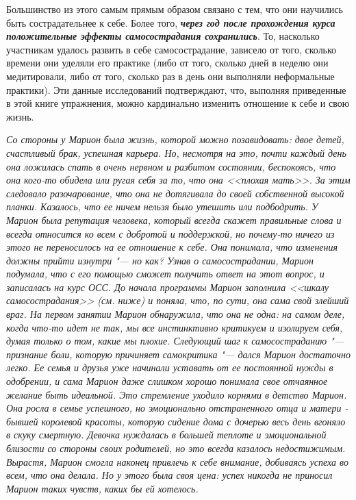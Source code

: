 Большинство из этого самым прямым образом связано с тем, что они научились быть сострадательнее к себе. Более того, \textit{\textbf{через год после прохождения курса положительные эффекты самосострадания сохранились}}. То, насколько участникам удалось развить в себе самосострадание, зависело от того, сколько времени они уделяли его практике (либо от того, сколько дней в неделю они медитировали, либо от того, сколько раз в день они выполняли неформальные практики). Эти данные исследований подтверждают, что, выполняя приведенные в этой книге упражнения, можно кардинально изменить отношение к себе и свою жизнь.

\vspace{2ex}

\textit{Со стороны у Марион была жизнь, которой можно позавидовать: двое детей, счастливый брак, успешная карьера. Но, несмотря на это, почти каждый день она ложилась спать в очень нервном и разбитом состоянии, беспокоясь, что она кого-то обидела или ругая себя за то, что она <<плохая мать>>. За этим следовало разочарование, что она не дотягивала до своей собственной высокой планки. Казалось, что ее ничем нельзя было утешить или подбодрить. У Марион была репутация человека, который всегда скажет правильные слова и всегда относится ко всем с добротой и поддержкой, но почему-то ничего из этого не переносилось на ее отношение к себе. Она понимала, что изменения должны прийти изнутри "--- но как? Узнав о самосострадании, Марион подумала, что с его помощью сможет получить ответ на этот вопрос, и записалась на курс ОСС. До начала программы Марион заполнила <<шкалу самосострадания>> (см. ниже) и поняла, что, по сути, она сама свой злейший враг. На первом занятии Марион обнаружила, что она не одна: на самом деле, когда что-то идет не так, мы все инстинктивно критикуем и изолируем себя, думая только о том, какие мы плохие. Следующий шаг к самосостраданию "--- признание боли, которую причиняет самокритика "--- дался Марион достаточно легко. Ее семья и друзья уже начинали уставать от ее постоянной нужды в одобрении, и сама Марион даже слишком хорошо понимала свое отчаянное желание быть идеальной. Это стремление уходило корнями в детство Марион. Она росла в семье успешного, но эмоционально отстраненного отца и матери - бывшей королевой красоты, которую сидение дома с дочерью весь день вгоняло в скуку смертную. Девочка нуждалась в большей теплоте и эмоциональной близости со стороны своих родителей, но это всегда казалось недостижимым. Вырастя, Марион смогла наконец привлечь к себе внимание, добиваясь успеха во всем, что она делала. Но у этого была своя цена: успех никогда не приносил Марион таких чувств, каких бы ей хотелось.} 

